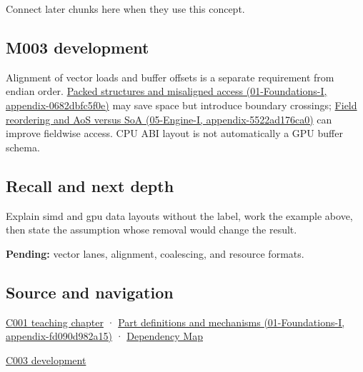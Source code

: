 Connect later chunks here when they use this concept.

\subsection{M003 development}\label{m003-development}

Alignment of vector loads and buffer offsets is a separate requirement from endian order. \href{}{Packed structures and misaligned access (01-Foundations-I, appendix-0682dbfc5f0e)} may save space but introduce boundary crossings; \href{}{Field reordering and AoS versus SoA (05-Engine-I, appendix-5522ad176ca0)} can improve fieldwise access. CPU ABI layout is not automatically a GPU buffer schema.

\subsection{Recall and next depth}\label{recall-and-next-depth}

Explain simd and gpu data layouts without the label, work the example above, then state the assumption whose removal would change the result.

\textbf{Pending:} vector lanes, alignment, coalescing, and resource formats.

\subsection{Source and navigation}\label{source-and-navigation}

\href{Continuous\%20Notes/Computing\%20Foundations\%20-\%20From\%20Bits\%20to\%20C++\%20and\%20Systems\%20APIs\#From\%20a\%20signal\%20to\%20an\%20interpretation}{C001 teaching chapter} · \href{}{Part definitions and mechanisms (01-Foundations-I, appendix-fd090d982a15)} · \hyperref[appendix-4ad47bdd269a]{Dependency Map}

\href{Continuous\%20Notes/Computing\%20Foundations\%20-\%20From\%20Bits\%20to\%20C++\%20and\%20Systems\%20APIs\#Where\%20the\%20bytes\%20live}{C003 development}
